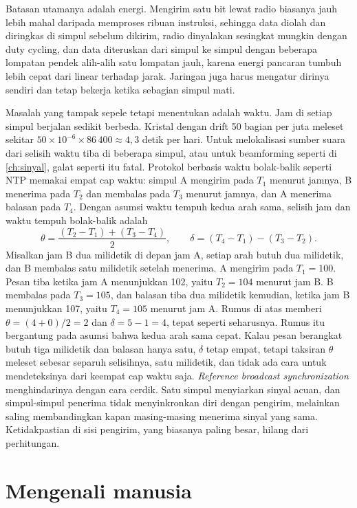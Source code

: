 Batasan utamanya adalah energi. Mengirim satu bit lewat radio biasanya jauh lebih mahal daripada memproses ribuan instruksi, sehingga
data diolah dan diringkas di simpul sebelum dikirim, radio dinyalakan sesingkat mungkin dengan duty cycling, dan data diteruskan dari
simpul ke simpul dengan beberapa lompatan pendek alih-alih satu lompatan jauh, karena energi pancaran tumbuh lebih cepat dari
linear terhadap jarak. Jaringan juga harus mengatur dirinya sendiri dan tetap bekerja ketika sebagian simpul mati.

Masalah yang tampak sepele tetapi menentukan adalah waktu. Jam di setiap simpul berjalan sedikit berbeda. Kristal dengan drift 50 bagian
per juta meleset sekitar $50\times10^{-6}\times86\,400\approx4{,}3$ detik per hari. Untuk melokalisasi sumber suara dari selisih waktu
tiba di beberapa simpul, atau untuk beamforming seperti di \cref{ch:sinyal}, galat seperti itu fatal. Protokol berbasis waktu bolak-balik
seperti NTP memakai empat cap waktu: simpul A mengirim pada $T_1$ menurut jamnya, B menerima pada $T_2$ dan membalas pada $T_3$ menurut
jamnya, dan A menerima balasan pada $T_4$. Dengan asumsi waktu tempuh kedua arah sama, selisih jam dan waktu tempuh bolak-balik adalah
\begin{equation}
\theta=\frac{(T_2-T_1)+(T_3-T_4)}2,\qquad \delta=(T_4-T_1)-(T_3-T_2).
\end{equation}
Misalkan jam B dua milidetik di depan jam A, setiap arah butuh dua milidetik, dan B membalas satu milidetik setelah menerima. A mengirim pada $T_1=100$. Pesan tiba ketika jam A menunjukkan 102, yaitu $T_2=104$ menurut jam B. B membalas pada $T_3=105$, dan balasan tiba dua milidetik kemudian, ketika jam B menunjukkan 107, yaitu $T_4=105$ menurut jam A. Rumus di atas memberi $\theta=(4+0)/2=2$ dan $\delta=5-1=4$, tepat seperti seharusnya. Rumus itu bergantung pada asumsi bahwa kedua arah sama cepat. Kalau pesan berangkat butuh tiga milidetik dan balasan hanya satu, $\delta$ tetap empat, tetapi taksiran $\theta$ meleset sebesar separuh selisihnya, satu milidetik, dan tidak ada cara untuk mendeteksinya dari keempat cap waktu saja. \emph{Reference broadcast synchronization}
menghindarinya dengan cara cerdik. Satu simpul menyiarkan sinyal acuan, dan simpul-simpul penerima tidak menyinkronkan diri dengan
pengirim, melainkan saling membandingkan kapan masing-masing menerima sinyal yang sama. Ketidakpastian di sisi pengirim, yang biasanya
paling besar, hilang dari perhitungan.

\section{Mengenali manusia}


